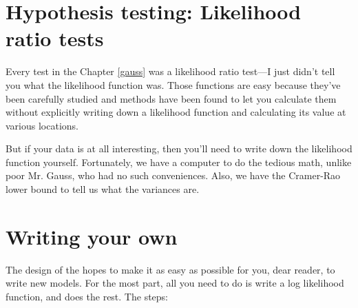 \section{Hypothesis testing: Likelihood ratio tests} Every test
in the Chapter \ref{gauss} was a likelihood ratio test---I just didn't tell
you what the likelihood function was. Those functions are easy because
they've been carefully studied and methods have been found to let you
calculate them without explicitly writing down a likelihood function
and calculating its value at various locations.

But if your data is at all interesting, then you'll need to write down
the likelihood function yourself.  Fortunately, we have a computer to
do the tedious math, unlike poor Mr. Gauss, who had no such conveniences.
Also, we have the Cramer-Rao lower bound to tell us what the variances
are. 



\section{Writing your own}
The design of the  hopes to make it as easy as possible for you,
dear reader, to write new models. For the most part, all you need to
do is write a log likelihood function, and 
does the rest. The steps:


